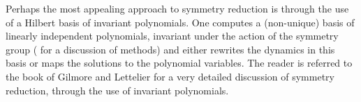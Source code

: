 Perhaps the most appealing approach to symmetry reduction is
through the use of a Hilbert basis of invariant polynomials.
One computes a (non-unique) basis of linearly independent
polynomials, invariant under the action of the symmetry group
(\cf {} for a discussion of
methods) and either rewrites the dynamics in this basis or
maps the solutions to the polynomial variables. The reader is
referred to the book of Gilmore and Lettelier
for a very detailed discussion of symmetry reduction, through
the use of invariant polynomials.
